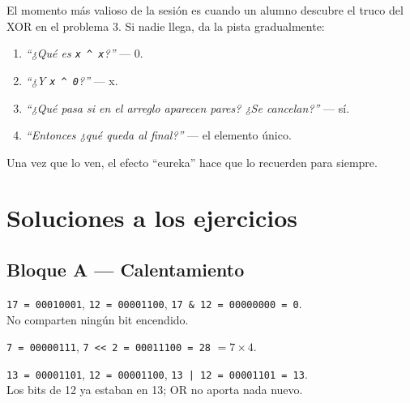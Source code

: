 \documentclass[12pt, oneside]{article}
\begin{document}
\begin{notaprofesor}
  El momento más valioso de la sesión es cuando un alumno descubre el truco
  del XOR en el problema 3. Si nadie llega, da la pista gradualmente:
  \begin{enumerate}
    \item \textit{``¿Qué es \texttt{x \textasciicircum{} x}?''} — 0.
    \item \textit{``¿Y \texttt{x \textasciicircum{} 0}?''} — x.
    \item \textit{``¿Qué pasa si en el arreglo aparecen pares? ¿Se cancelan?''} — sí.
    \item \textit{``Entonces ¿qué queda al final?''} — el elemento único.
  \end{enumerate}
  Una vez que lo ven, el efecto ``eureka'' hace que lo recuerden para siempre.
\end{notaprofesor}

\section{Soluciones a los ejercicios}

\subsection{Bloque A — Calentamiento}

\begin{notaprofesor}
  \texttt{17 = 00010001},
  \texttt{12 = 00001100},
  \texttt{17 \& 12 = 00000000 = 0}.\\[4pt]
  No comparten ningún bit encendido.
\end{notaprofesor}

\begin{notaprofesor}
  \texttt{7 = 00000111},
  \texttt{7 << 2 = 00011100 = 28} $= 7 \times 4$.
\end{notaprofesor}

\begin{notaprofesor}
  \texttt{13 = 00001101},
  \texttt{12 = 00001100},
  \texttt{13 | 12 = 00001101 = 13}.\\[4pt]
  Los bits de 12 ya estaban en 13; OR no aporta nada nuevo.
\end{notaprofesor}
\end{document}
